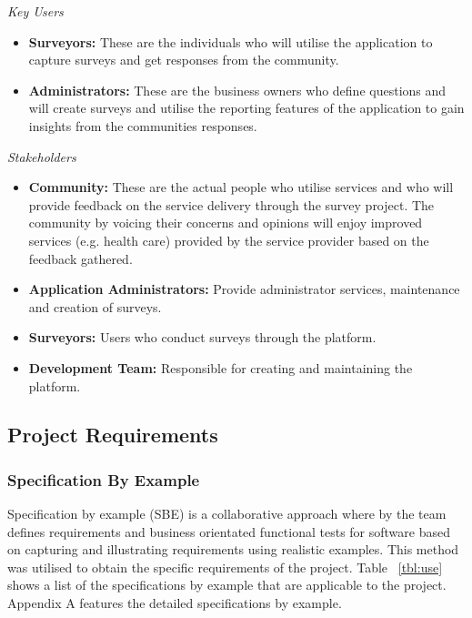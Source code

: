 \documentclass[12pt]{witseiepaper}
\begin{document}
\emph{Key Users} 
\begin{itemize}
  \item \textbf{Surveyors:} These are the individuals who will utilise the application to capture surveys and get responses from the community.
  \item \textbf{Administrators:} These are the business owners who define questions and will create surveys and utilise the reporting features of the application to gain insights from the communities responses.
\end{itemize}

\emph{Stakeholders} 
\begin{itemize}
  \item \textbf{Community:} These are the actual people who utilise services and who will provide feedback on the service delivery through the survey project. The community by voicing their concerns and opinions will enjoy improved services (e.g. health care) provided by the service provider based on the feedback gathered.
  \item \textbf{Application Administrators:} Provide administrator services, maintenance and creation of surveys.
  \item \textbf{Surveyors:} Users who conduct surveys through the platform.
  \item \textbf{Development Team:} Responsible for creating and maintaining the platform. 
\end{itemize}


\subsection{Project Requirements}
\subsubsection{Specification By Example}
Specification by example (SBE) is a collaborative approach where by the team defines requirements and business orientated functional tests for software based on capturing and illustrating requirements using realistic examples. This method was utilised to obtain the specific requirements of the project.
Table ~\ref{tbl:use} shows a list of the specifications by example that are applicable to the project. Appendix A features the detailed specifications by example.
\end{document}
